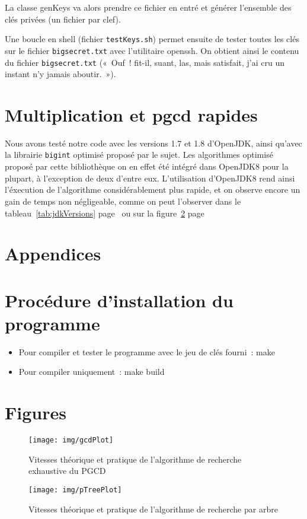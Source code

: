 \documentclass[a4paper,10pt]{article}
\begin{document}
  La classe genKeys va alors prendre ce fichier en entré et générer l'ensemble des clés privées (un fichier par clef).
  
  Une boucle en shell (fichier \texttt{testKeys.sh}) permet ensuite de tester toutes les clés sur le fichier \texttt{bigsecret.txt} avec l'utilitaire openssh. On obtient ainsi le contenu du fichier \texttt{bigsecret.txt} («~Ouf~! fit-il, suant, las, mais satisfait, j'ai cru un instant n'y jamais aboutir.~»).

\section{Multiplication et pgcd rapides}
  Nous avons testé notre code avec les versions 1.7 et 1.8 d'OpenJDK, ainsi qu'avec la librairie \texttt{bigint} optimisé proposé par le sujet. Les algorithmes optimisé proposé par cette bibliothèque on en effet été intégré dans OpenJDK8 pour la plupart, à l'exception de deux d'entre eux.
  L'utilisation d'OpenJDK8 rend ainsi l'éxecution de l'algorithme considérablement plus rapide, et on observe encore un gain de temps non négligeable, comme on peut l'observer dans le tableau~\ref{tab:jdkVersions} page~\pageref{tab:jdkVersions}  ou sur la figure~\ref{fig:pTreeChart} page~\pageref{fig:pTreeChart}
  

\appendix
\section*{Appendices}
\section{Procédure d'installation du programme}
\begin{itemize}
  \item Pour compiler et tester le programme avec le jeu de clés fourni~:
    make

  \item Pour compiler uniquement~:
    make build
\end{itemize}

\section{Figures}
\begin{figure}[ht]
  \texttt{[image: img/gcdPlot]}
  \caption{\label{fig:gcdSpeedChart}Vitesses théorique et pratique de l'algorithme de recherche exhaustive du PGCD}
\end{figure}
\begin{figure}[ht]
  \texttt{[image: img/pTreePlot]}
  \caption{\label{fig:pTreeChart}Vitesses théorique et pratique de l'algorithme de recherche par arbre}
\end{figure}
\end{document}
